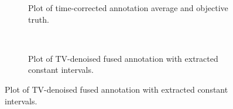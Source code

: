 \documentclass[preview]{standalone}
\begin{document}
\begin{minipage}{19.05cm}
    \begin{figure}
    	\centering

    	\begin{subfigure}{0.66\textwidth}
        
     	\vspace{-0.5cm}
     	\caption{Plot of time-corrected annotation average and objective truth.}
    	\label{Fig:4a}
    	\end{subfigure}
    	~
    	\begin{subfigure}{0.66\textwidth}
        
    	\vspace{-0.5cm}
    	\caption{Plot of TV-denoised fused annotation with extracted constant intervals.}
    	\label{Fig:4b}
    	\end{subfigure}

    \end{figure}
\end{minipage}
\end{document}

